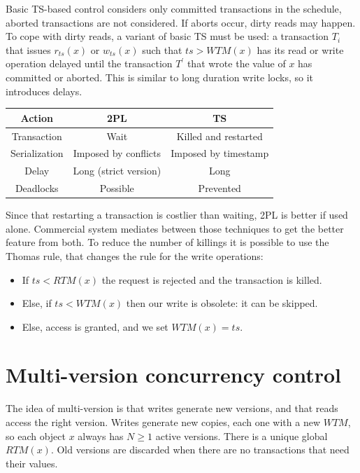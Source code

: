 \documentclass[12pt, a4paper]{report}
\newtheorem[style=M,bodystyle=\normalfont]{theorem}{Theorem}
\newtheorem[style=M,bodystyle=\normalfont]{corollary}{Corollary}
\newtheorem[style=M,bodystyle=\normalfont]{lemma}{Lemma}
\newtheorem[style=M,bodystyle=\normalfont]{definition}{Definition}
\begin{document}
    Basic TS-based control considers only committed transactions in the schedule, aborted transactions are not considered. If aborts occur, dirty reads may happen. To cope with dirty 
    reads, a variant of basic TS must be used: a transaction $T_i$ that issues $r_{ts}(x)$ or $w_{ts}(x)$ such that $ts>WTM(x)$ has its read or write operation delayed until the
    transaction $T^{'}$ that wrote the value of $x$ has committed or aborted. This is similar to long duration write locks, so it introduces delays. 
    \begin{table}[H]
        \centering
        \begin{tabular}{c|cc}
        \textbf{Action} & \textbf{2PL}          & \textbf{TS}          \\ \hline
        Transaction     & Wait                  & Killed and restarted \\
        Serialization   & Imposed by conflicts  & Imposed by timestamp \\
        Delay           & Long (strict version) & Long                 \\
        Deadlocks       & Possible              & Prevented           
        \end{tabular}
    \end{table}
    Since that restarting a transaction is costlier than waiting, 2PL is better if used alone. Commercial system mediates between those techniques to get the better feature from both. 
    To reduce the number of killings it is possible to use the Thomas rule, that changes the rule for the write operations: 
    \begin{itemize}
        \item If $ts<RTM(x)$ the request is rejected and the transaction is killed. 
        \item Else, if $ts<WTM(x)$ then our write is obsolete: it can be skipped. 
        \item Else, access is granted, and we set $WTM(x)=ts$. 
    \end{itemize}

    \section{Multi-version concurrency control}
    The idea of multi-version is that writes generate new versions, and that reads access the right version. Writes generate new copies, each one with a new $WTM$, so each object $x$ 
    always has $N \geq 1$ active versions. There is a unique global $RTM(x)$. Old versions are discarded when there are no transactions that need their values. 
    
\end{document}
